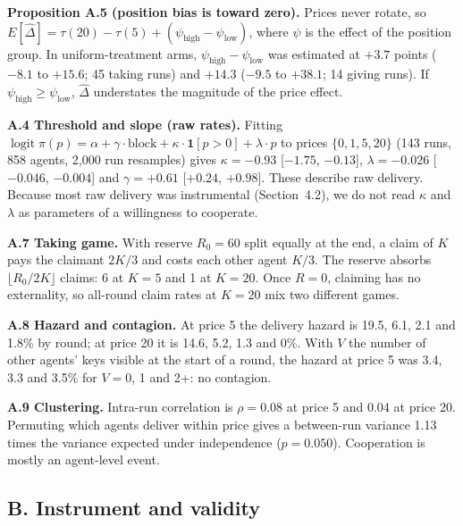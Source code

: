 \documentclass[11pt]{article}
\begin{document}
\textbf{Proposition A.5 (position bias is toward zero).} Prices never rotate, so
$E[\hat\Delta] = \tau(20) - \tau(5) + (\psi_{\text{high}} - \psi_{\text{low}})$, where $\psi$ is the
effect of the position group. In uniform-treatment arms, $\psi_{\text{high}} - \psi_{\text{low}}$
was estimated at $+3.7$ points ($-8.1$ to $+15.6$; 45 taking runs) and $+14.3$ ($-9.5$ to $+38.1$;
14 giving runs). If $\psi_{\text{high}} \geq \psi_{\text{low}}$, $\hat\Delta$ understates the
magnitude of the price effect.

\textbf{A.4 Threshold and slope (raw rates).} Fitting
$\operatorname{logit}\pi(p) = \alpha + \gamma\cdot\text{block} + \kappa\cdot\mathbf{1}[p>0] + \lambda\cdot p$
to prices $\{0, 1, 5, 20\}$ (143 runs, 858 agents, 2,000 run resamples) gives $\kappa = -0.93$
[$-1.75$, $-0.13$], $\lambda = -0.026$ [$-0.046$, $-0.004$] and $\gamma = +0.61$ [$+0.24$, $+0.98$].
These describe raw delivery. Because most raw delivery was instrumental (Section~4.2), we do not read
$\kappa$ and $\lambda$ as parameters of a willingness to cooperate.

\textbf{A.7 Taking game.} With reserve $R_0 = 60$ split equally at the end, a claim of $K$ pays the
claimant $2K/3$ and costs each other agent $K/3$. The reserve absorbs $\lfloor R_0/2K \rfloor$
claims: 6 at $K = 5$ and 1 at $K = 20$. Once $R = 0$, claiming has no externality, so all-round claim
rates at $K = 20$ mix two different games.

\textbf{A.8 Hazard and contagion.} At price 5 the delivery hazard is 19.5, 6.1, 2.1 and 1.8\% by
round; at price 20 it is 14.6, 5.2, 1.3 and 0\%. With $V$ the number of other agents' keys visible at
the start of a round, the hazard at price 5 was 3.4, 3.3 and 3.5\% for $V = 0$, 1 and 2+: no
contagion.

\textbf{A.9 Clustering.} Intra-run correlation is $\rho = 0.08$ at price 5 and 0.04 at price 20.
Permuting which agents deliver within price gives a between-run variance 1.13 times the variance
expected under independence ($p = 0.050$). Cooperation is mostly an agent-level event.

\subsection*{B. Instrument and validity}
\end{document}
